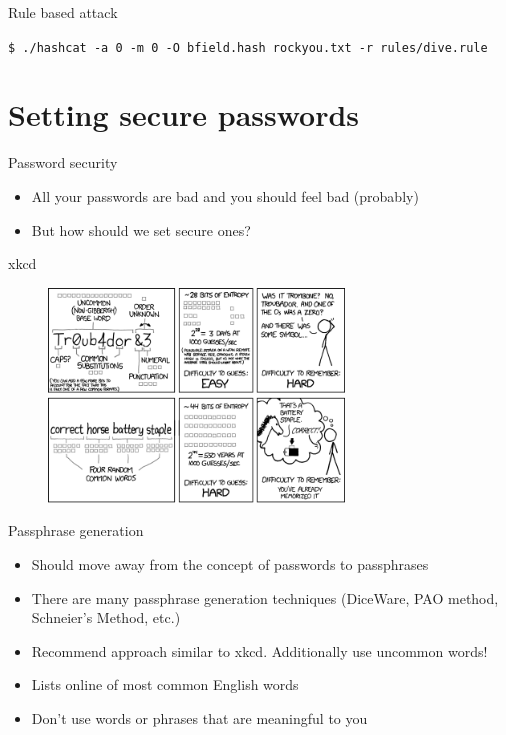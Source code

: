 \documentclass[12pt,aspectratio=169]{beamer}
\renewcommand{\emph}[1]{{\color{mLightBrown}#1}}
\begin{document}
\begin{frame}{Rule based attack}
  \raggedright
  \lstinline|$ ./hashcat -a 0 -m 0 -O bfield.hash rockyou.txt -r rules/dive.rule|
\end{frame}

\section{Setting secure passwords}

\begin{frame}{Password security}
  \begin{itemize}
    \item All your passwords are bad and you should feel bad (probably)
    \item But how should we set secure ones?
  \end{itemize}
\end{frame}

\begin{frame}{xkcd}
  \begin{figure}[h]
    \includegraphics[width=0.7\textwidth]{xkcd.png}
  \end{figure}
\end{frame}

\begin{frame}{Passphrase generation}
  \begin{itemize}
    \item Should move away from the concept of passwords to \emph{passphrases}
    \item There are many passphrase generation techniques (DiceWare, PAO method, Schneier's Method, etc.)
    \item Recommend approach similar to xkcd. Additionally use uncommon words!
    \item Lists online of most common English words
    \item Don't use words or phrases that are meaningful to you
  \end{itemize}
\end{frame}
\end{document}
